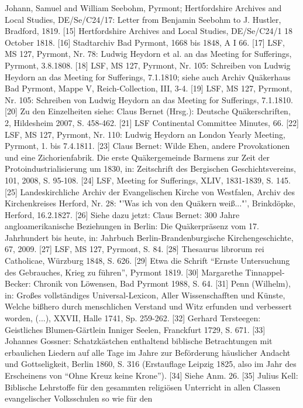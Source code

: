 Johann, Samuel and William Seebohm, Pyrmont; Hertfordshire Archives and Local
Studies, DE/Se/C24/17: Letter from Benjamin Seebohm to J. Hustler, Bradford,
1819.
[15] Hertfordshire Archives and Local Studies, DE/Se/C24/1 18 October 1818.
[16] Stadtarchiv Bad Pyrmont, 1668 bis 1848, A I 66.
[17] LSF, MS 127, Pyrmont, Nr. 78: Ludwig Heydorn et al. an das Meeting for
Sufferings, Pyrmont, 3.8.1808.
[18] LSF, MS 127, Pyrmont, Nr. 105: Schreiben von Ludwig Heydorn an das Meeting
for Sufferings, 7.1.1810; siehe auch Archiv Quäkerhaus Bad Pyrmont, Mappe V,
Reich-Collection, III, 3-4.
[19] LSF, MS 127, Pyrmont, Nr. 105: Schreiben von Ludwig Heydorn an das Meeting
for Sufferings, 7.1.1810.
[20] Zu den Einzelheiten siehe: Claus Bernet (Hrsg.): Deutsche Quäkerschriften,
2, Hildesheim 2007, S. 458-462.
[21] LSF Continental Committee Minutes, 66.
[22] LSF, MS 127, Pyrmont, Nr. 110: Ludwig Heydorn an London Yearly Meeting,
Pyrmont, 1. bis 7.4.1811.
[23] Claus Bernet: Wilde Ehen, andere Provokationen und eine Zichorienfabrik.
Die erste Quäkergemeinde Barmens zur Zeit der Protoindustrialisierung um 1830,
in: Zeitschrift des Bergischen Geschichtsvereins, 101, 2008, S. 95-108.
[24] LSF, Meeting for Sufferings, XLIV, 1831-1839, S. 145.
[25] Landeskirchliche Archiv der Evangelischen Kirche von Westfalen, Archiv des
Kirchenkreises Herford, Nr. 28: "'Was ich von den Quäkern weiß..."', Brinkdöpke,
Herford, 16.2.1827.
[26] Siehe dazu jetzt: Claus Bernet: 300 Jahre angloamerikanische Beziehungen in
Berlin: Die Quäkerpräsenz vom 17. Jahrhundert bis heute, in: Jahrbuch
Berlin-Brandenburgische Kirchengeschichte, 67, 2009.
[27] LSF, MS 127, Pyrmont, S. 84.
[28] Thesaurus librorum rei Catholicae, Würzburg 1848, S. 626.
[29] Etwa die Schrift "`Ernste Untersuchung des Gebrauches, Krieg zu führen"',
Pyrmont 1819.
[30] Margarethe Tinnappel-Becker: Chronik von Löwensen, Bad Pyrmont 1988, S. 64.
[31] Penn (Wilhelm), in: Großes vollständiges Universal-Lexicon, Aller
Wissenschafften und Künste, Welche bißhero durch menschlichen Verstand und Witz
erfunden und verbessert worden, (...), XXVII, Halle 1741, Sp. 259-262.
[32] Gerhard Tersteegen: Geistliches Blumen-Gärtlein Inniger Seelen, Franckfurt
1729, S. 671.
[33] Johannes Gossner: Schatzkästchen enthaltend biblische Betrachtungen mit
erbaulichen Liedern auf alle Tage im Jahre zur Beförderung häuslicher Andacht
und Gottseligkeit, Berlin 1860, S. 316 (Erstauflage Leipzig 1825, also im Jahr
des Erscheinens von "`Ohne Kreuz keine Krone"').
[34] Siehe Anm. 26.
[35] Julius Kell: Biblische Lehrstoffe für den gesammten religiösen Unterricht
in allen Classen evangelischer Volksschulen so wie für den
